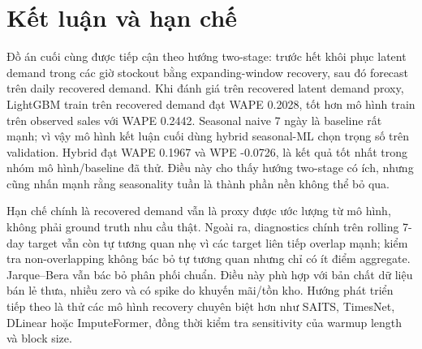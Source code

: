 \documentclass[12pt,a4paper]{article}
\begin{document}
\section{Kết luận và hạn chế}
Đồ án cuối cùng được tiếp cận theo hướng two-stage: trước hết khôi phục latent demand trong các giờ stockout bằng expanding-window recovery, sau đó forecast trên daily recovered demand.
Khi đánh giá trên recovered latent demand proxy, LightGBM train trên recovered demand đạt WAPE 0.2028, tốt hơn mô hình train trên observed sales với WAPE 0.2442.
Seasonal naive 7 ngày là baseline rất mạnh; vì vậy mô hình kết luận cuối dùng hybrid seasonal-ML chọn trọng số trên validation.
Hybrid đạt WAPE 0.1967 và WPE -0.0726, là kết quả tốt nhất trong nhóm mô hình/baseline đã thử.
Điều này cho thấy hướng two-stage có ích, nhưng cũng nhấn mạnh rằng seasonality tuần là thành phần nền không thể bỏ qua.

Hạn chế chính là recovered demand vẫn là proxy được ước lượng từ mô hình, không phải ground truth nhu cầu thật.
Ngoài ra, diagnostics chính trên rolling 7-day target vẫn còn tự tương quan nhẹ vì các target liên tiếp overlap mạnh; kiểm tra non-overlapping không bác bỏ tự tương quan nhưng chỉ có ít điểm aggregate.
Jarque--Bera vẫn bác bỏ phân phối chuẩn.
Điều này phù hợp với bản chất dữ liệu bán lẻ thưa, nhiều zero và có spike do khuyến mãi/tồn kho.
Hướng phát triển tiếp theo là thử các mô hình recovery chuyên biệt hơn như SAITS, TimesNet, DLinear hoặc ImputeFormer, đồng thời kiểm tra sensitivity của warmup length và block size.
\end{document}
